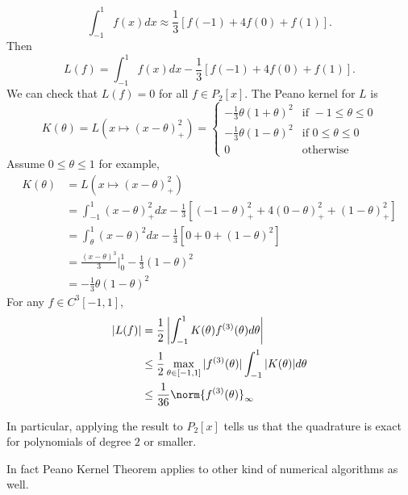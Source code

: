 \documentclass[a4paper]{article}
\begin{document}
\begin{eg}
  \[
    \int_{-1}^1 f(x)dx \approx \frac{1}{3} [f(-1) + 4f(0) + f(1)].
  \]
  Then
  \[
    L(f) = \int_{-1}^1 f(x)dx - \frac{1}{3}[f(-1) + 4f(0) + f(1)].
  \]
  We can check that \(L(f) = 0\) for all \(f \in P_2[x]\). The Peano kernel for \(L\) is
  \[
    K(\theta) = L(x \mapsto (x - \theta)_+^2) =
    \begin{cases}
      -\frac{1}{3}\theta(1 + \theta)^2 & \text{if } -1 \leq \theta \leq 0 \\
      -\frac{1}{3}\theta(1 - \theta)^2 & \text{if } 0 \leq \theta \leq 0 \\
      0 & \text{otherwise}
    \end{cases}
  \]
  Assume \(0 \leq \theta \leq 1\) for example,
  \begin{align*}
    K(\theta)
    &= L(x \mapsto (x - \theta)_+^2) \\
    &= \int_{-1}^1 (x - \theta)_+^2 dx - \frac{1}{3} \left[(-1 - \theta)_+^2 + 4(0 - \theta)_+^2 + (1 - \theta)_+^2 \right] \\
    &= \int_\theta^1 (x - \theta)^2 dx - \frac{1}{3}[0 + 0 + (1 - \theta)^2] \\
    &= \frac{(x - \theta)^3}{3}\Big|_0^1 - \frac{1}{3}(1 - \theta)^2 \\
    &= -\frac{1}{3}\theta(1 - \theta)^2
  \end{align*}
  For any \(f \in C^3[-1, 1]\),
  \begin{align*}
    |L(f)| &= \frac{1}{2}\left| \int_{-1}^1 K(\theta)f^{(3)}(\theta)d\theta \right| \\
           &\leq \frac{1}{2} \max_{\theta \in [-1, 1]} |f^{(3)}(\theta)| \int_{-1}^1|K(\theta)| d\theta \\
           &\leq \frac{1}{36} \norm{f^{(3)}(\theta)}_\infty
  \end{align*}

  In particular, applying the result to \(P_2[x]\) tells us that the quadrature is exact for polynomials of degree \(2\) or smaller.
\end{eg}

In fact Peano Kernel Theorem applies to other kind of numerical algorithms as well.
\end{document}
